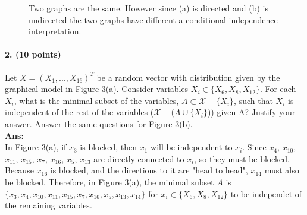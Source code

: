 \documentclass[11pt]{article}
\begin{document}
\begin{figure}[h]
{
\label{ugm}
}
\caption{Two graphs are the same. However since (a) is directed and (b) is undirected the two graphs have different a conditional independence interpretation.}
\end{figure}

\paragraph{2. (10 points)} Let $X = (X_1, . . . , X_{16})^T$ be a random vector with distribution given by the graphical model in Figure 3(a). Consider variables $X_i \in \{ X_{6}, X_{8}, X_{12} \}$.  For each $X_{i}$, what is the minimal subset of the variables, $A\subset \mathcal{X} -\{X_{i}\}$, such that $X_{i}$ is independent of the rest of the variables ($\mathcal{X} - (A\cup{\{ X_{i}\}}$)) given A? Justify your answer.  Answer the same questions for Figure 3(b).\\
\textbf{Ans:}\\
In Figure 3(a), if $x_3$ is blocked, then $x_1$ will be independent to $x_i$. Since $x_4$, $x_{10}$, $x_{11}$, $x_{15}$, $x_7$, $x_{16}$, $x_5$, $x_{13}$ are directly connected to $x_i$, so they must be blocked. Because $x_16$ is blocked, and the directions to it are "head to head", $x_{14}$ must also be blocked. Therefore, in Figure 3(a), the minimal subset $A$ is $\{x_3, x_4, x_{10}, x_{11}, x_{15}, x_7, x_{16}, x_5, x_{13}, x_{14}\}$ for $x_i \in \{ X_{6}, X_{8}, X_{12}\}$ to be independet of the remaining variables.\\
\end{document}
